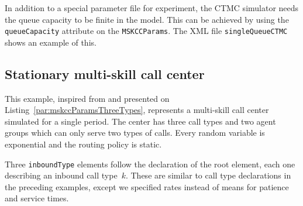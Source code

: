 In addition to a special parameter file for experiment, the CTMC
simulator needs the queue capacity to be finite in the model.
This can be achieved by using the \texttt{queue\-Capacity} attribute
on the \texttt{MSKCCParams}. The XML file \texttt{single\-Queue\-CTMC}
shows an example of this.

\subsection{Stationary multi-skill call center}
\label{sec:mskccParamsThreeTypes}

This example, inspired from \cite{ccKOO00a} and presented on
Listing~\ref{par:mskccParamsThreeTypes},
represents a multi-skill call center
simulated for a single period.
The center has three call types and two agent
groups which can only serve two types of calls.
Every random variable is exponential and the routing
policy is static.




Three \texttt{inbound\-Type} elements
follow the declaration
of the root element, each one describing an inbound call type~$k$.
These are similar to call type declarations in the preceding examples,
except we specified rates instead of means for patience and service
times.

